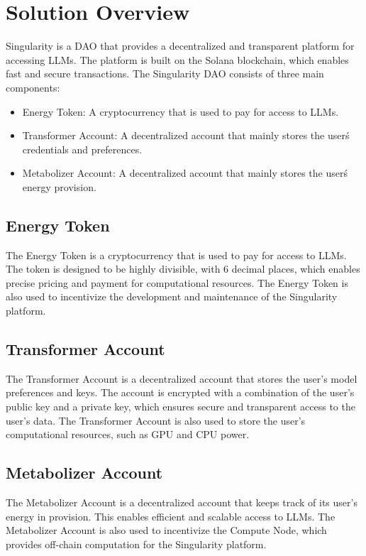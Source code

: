 \documentclass{article}
\begin{document}
\section{Solution Overview}

Singularity is a DAO that provides a decentralized and transparent platform for accessing LLMs. The platform is built on the Solana blockchain, which enables fast and secure transactions. The Singularity DAO consists of three main components:

\begin{itemize}
\item Energy Token: A cryptocurrency that is used to pay for access to LLMs.
\item Transformer Account: A decentralized account that mainly stores the user\'s credentials and preferences.
\item Metabolizer Account: A decentralized account that mainly stores the user\'s energy provision.
\end{itemize}

\subsection{Energy Token}

The Energy Token is a cryptocurrency that is used to pay for access to LLMs. The token is designed to be highly divisible, with 6 decimal places, which enables precise pricing and payment for computational resources. The Energy Token is also used to incentivize the development and maintenance of the Singularity platform.

\subsection{Transformer Account}

The Transformer Account is a decentralized account that stores the user's model preferences and keys. The account is encrypted with a combination of the user's public key and a private key, which ensures secure and transparent access to the user's data. The Transformer Account is also used to store the user's computational resources, such as GPU and CPU power.

\subsection{Metabolizer Account}

The Metabolizer Account is a decentralized account that keeps track of its user's energy in provision. This enables efficient and scalable access to LLMs. The Metabolizer Account is also used to incentivize the Compute Node, which provides off-chain computation for the Singularity platform.
\end{document}
